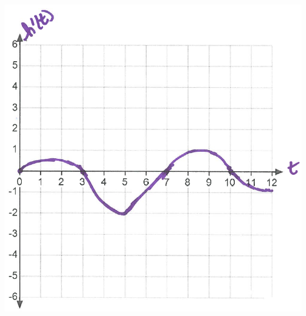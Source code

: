 \documentclass[nooutcomes]{ximera}
\begin{document}
\begin{problem}
\begin{enumerate}
\begin{freeResponse}
\begin{image}
			\includegraphics[scale=.4]{Figure12.png}
			\end{image}
			\end{freeResponse}
	\end{enumerate}

\end{problem}
\end{document}
